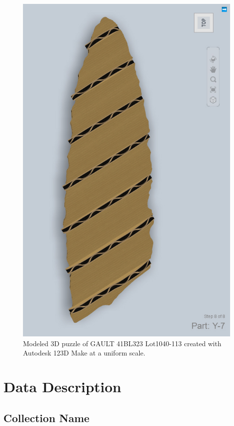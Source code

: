 \documentclass[preprint,12pt]{elsarticle}
\begin{document}
\begin{figure}[ht]\centering
\includegraphics[width=0.95\linewidth]{Fig5}
\caption{Modeled 3D puzzle of GAULT 41BL323 Lot1040-113 \cite{Selden:Z27} created with Autodesk 123D Make at a uniform scale.}
\label{fig:Fig5}
\end{figure}

\section{Data Description}

\subsection{Collection Name}
\end{document}
